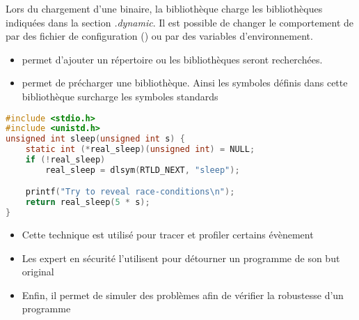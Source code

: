 \begin{frame}[fragile=singleslide]{}
  Lors du chargement d'une binaire, la bibliothèque  charge
  les bibliothèques indiquées dans  la section \emph{.dynamic}. Il est
  possible de  changer le comportement de   par des fichier
  de  configuration  ()  ou  par  des  variables
  d'environnement.
  \begin{itemize} 
  \item  {} permet d'ajouter  un répertoire  ou les
    bibliothèques seront recherchées.
  \item  {}  permet  de  précharger  une  bibliothèque.
    Ainsi les  symboles définis dans cette  bibliothèque surcharge les
    symboles standards
  \end{itemize}
\end{frame}  

\begin{frame}[fragile=singleslide]{}
    \begin{lstlisting}[language=c]
#include <stdio.h>
#include <unistd.h>
unsigned int sleep(unsigned int s) {
    static int (*real_sleep)(unsigned int) = NULL;
    if (!real_sleep)
        real_sleep = dlsym(RTLD_NEXT, "sleep");

    printf("Try to reveal race-conditions\n");
    return real_sleep(5 * s);
}
    \end{lstlisting} 
\end{frame}  

\begin{frame}[fragile=singleslide]{}
  \begin{itemize} 
    \begin{lstlisting} 
host$ gcc -shared -ldl -fPIC mysleep.c -o libmysleep.so
target$ LD_PRELOAD=libmysleep.so ./hello 
target$ export LD_PRELOAD=libmysleep.so
taregt$ ./hello 
    \end{lstlisting} 
  \item Cette  technique est utilisé pour tracer  et profiler certains
    évènement
  \item Les expert en sécurité l'utilisent pour détourner un programme
    de son but original
  \item Enfin, il permet de  simuler des problèmes afin de vérifier la
    robustesse d'un programme
  \end{itemize} 
\end{frame}

